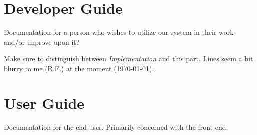\documentclass[a4paper,oneside]{alpenthesis/alpenthesis}
\begin{document}










\part{Developer Guide}
\label{part:Developer_Guide}
Documentation for a person who wishes to utilize our system in their work and/or
improve upon it?

Make sure  to distinguish  between \emph{Implementation} and  this part. Lines
seem a bit blurry to me (R.F.) at the moment (\today).

\part{User Guide} 
\label{part:User_Guide}
Documentation  for the  end user. Primarily  concerned with  the 
front-end.
\end{document}
